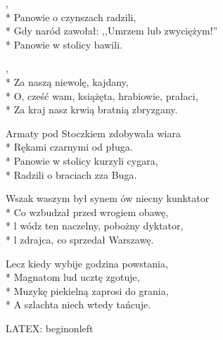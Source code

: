 \begin{lyrics}[longestline={Gdy naród zawołał: ,,Umrzem lub zwyciężym!''}]

,\\*
Panowie o czynszach radzili,\\*
Gdy naród zawołał: ,,Umrzem lub zwyciężym!''\\*
Panowie w stolicy bawili.

\begin{chorus}
,\\*
Za naszą niewolę, kajdany,\\*
O, cześć wam, książęta, hrabiowie, prałaci,\\*
Za kraj nasz krwią bratnią zbryzgany.
\end{chorus}

Armaty pod Stoczkiem zdobywała wiara\\*
Rękami czarnymi od pługa.\\*
Panowie w stolicy kurzyli cygara,\\*
Radzili o braciach zza Buga.

\chorusref

Wszak waszym był synem ów niecny kunktator\\*
Co wzbudzał przed wrogiem obawę,\\*
l wódz ten naczelny, pobożny dyktator,\\*
l zdrajca, co sprzedał Warszawę.

\chorusref

Lecz kiedy wybije godzina powstania,\\*
Magnatom lud ucztę zgotuje,\\*
Muzykę piekielną zaprosi do grania,\\*
A szlachta niech wtedy tańcuje.

\chorusref
\end{lyrics}



\begin{info}LATEX: beginonleft\end{info}

